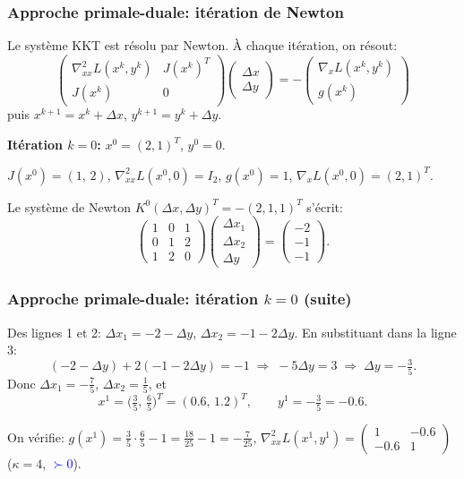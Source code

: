 \documentclass[t,usepdftitle=false,aspectratio=169]{beamer}
\begin{document}
\begin{frame}
\frametitle{Approche primale-duale: itération de Newton}

Le système KKT est résolu par Newton. À chaque itération, on résout:
$$
\begin{pmatrix}\nabla^2_{xx}L(x^k,y^k) & J(x^k)^T \\ J(x^k) & 0\end{pmatrix}
\begin{pmatrix}\Delta x \\ \Delta y\end{pmatrix}
= -\begin{pmatrix}\nabla_x L(x^k,y^k) \\ g(x^k)\end{pmatrix}
$$
puis $x^{k+1} = x^k + \Delta x$, $y^{k+1} = y^k + \Delta y$.

\mbox{}

\textbf{Itération $k=0$:} $x^0=(2,1)^T$, $y^0=0$.

$J(x^0) = (1,\,2)$, $\nabla^2_{xx}L(x^0,0) = I_2$, $g(x^0)=1$, $\nabla_x L(x^0,0) = (2,1)^T$.

Le système de Newton $K^0(\Delta x, \Delta y)^T = -(2,1,1)^T$ s'écrit:
$$
\begin{pmatrix}1&0&1\\0&1&2\\1&2&0\end{pmatrix}\begin{pmatrix}\Delta x_1\\\Delta x_2\\\Delta y\end{pmatrix} = \begin{pmatrix}-2\\-1\\-1\end{pmatrix}.
$$

\end{frame}

\begin{frame}
\frametitle{Approche primale-duale: itération $k=0$ (suite)}

Des lignes 1 et 2: $\Delta x_1 = -2-\Delta y$, $\Delta x_2 = -1-2\Delta y$. En substituant dans la ligne 3:
$$
(-2-\Delta y)+2(-1-2\Delta y) = -1 \;\Longrightarrow\; -5\Delta y = 3 \;\Longrightarrow\; \Delta y = -\tfrac{3}{5}.
$$
Donc $\Delta x_1=-\tfrac{7}{5}$, $\Delta x_2=\tfrac{1}{5}$, et
$$
x^1=\bigl(\tfrac{3}{5},\,\tfrac{6}{5}\bigr)^T = (0.6,\,1.2)^T, \qquad y^1=-\tfrac{3}{5} = -0.6.
$$

On vérifie: $g(x^1)=\tfrac{3}{5}\cdot\tfrac{6}{5}-1 = \tfrac{18}{25}-1 = -\tfrac{7}{25}$, $\nabla^2_{xx}L(x^1,y^1)=\begin{pmatrix}1&-0.6\\-0.6&1\end{pmatrix}$ ($\kappa=4$, \textcolor{blue}{$\succ 0$}).

\end{frame}
\end{document}
